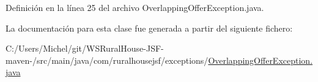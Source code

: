 Definición en la línea 25 del archivo Overlapping\+Offer\+Exception.\+java.



La documentación para esta clase fue generada a partir del siguiente fichero\+:\begin{DoxyCompactItemize}
\item 
C\+:/\+Users/\+Michel/git/\+W\+S\+Rural\+House-\/\+J\+S\+F-\/maven-\//src/main/java/com/ruralhousejsf/exceptions/\mbox{\hyperlink{_overlapping_offer_exception_8java}{Overlapping\+Offer\+Exception.\+java}}\end{DoxyCompactItemize}
